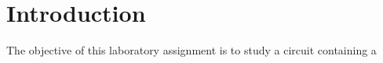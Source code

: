\section{Introduction}
\label{sec:introduction}

The objective of this laboratory assignment is to study a circuit containing a

